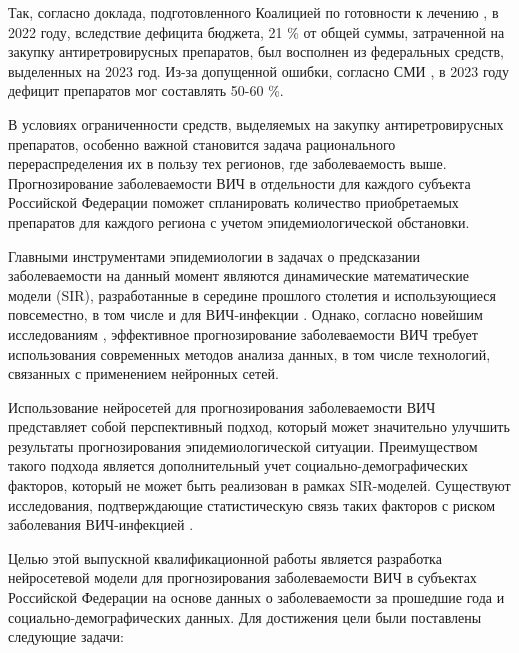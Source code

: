     Так, согласно доклада, подготовленного Коалицией по готовности к лечению \cite{Мониторинг_закупок_препаратов_ITPC}, в 2022 году, вследствие дефицита бюджета, 21 \% от общей суммы, затраченной на закупку антиретровирусных препаратов, был восполнен из федеральных средств, выделенных на 2023 год. Из-за допущенной ошибки, согласно СМИ \cite{ngs_ru_deficit_2023,fontanka_deficit}, в 2023 году дефицит препаратов мог составлять 50-60 \%.

    В условиях ограниченности средств, выделяемых на закупку антиретровирусных препаратов, особенно важной становится задача рационального перераспределения их в пользу тех регионов, где заболеваемость выше. Прогнозирование заболеваемости ВИЧ в отдельности для каждого субъекта Российской Федерации поможет спланировать количество приобретаемых препаратов для каждого региона с учетом эпидемиологической обстановки.
    
    Главными инструментами эпидемиологии в задачах о предсказании заболеваемости на данный момент являются динамические математические модели (SIR), разработанные в середине прошлого столетия и использующиеся повсеместно, в том числе и для ВИЧ-инфекции \cite{Лопатин_про_SIR,Sokolova_SIR_HIV,Brauer_про_SIR,Huppert_Katriel_SIR}. Однако, согласно новейшим исследованиям \cite{LSTM_for_HIV, NN_REVIEW_for_HIV, NN_FORECASTING_for_HIV}, эффективное прогнозирование заболеваемости ВИЧ требует использования современных методов анализа данных, в том числе технологий, связанных с применением нейронных сетей. 

    Использование нейросетей для прогнозирования заболеваемости ВИЧ представляет собой перспективный подход, который может значительно улучшить результаты прогнозирования эпидемиологической ситуации. Преимуществом такого подхода является дополнительный учет социально-демографических факторов, который не может быть реализован в рамках SIR-моделей. Существуют исследования, подтверждающие статистическую связь таких факторов с риском заболевания ВИЧ-инфекцией \cite{UrFu_socio_factors, Zanakis_Ortiz_socio_factors}. 
    
    Целью этой выпускной квалификационной работы является разработка нейросетевой модели для прогнозирования заболеваемости ВИЧ в субъектах Российской Федерации на основе данных о заболеваемости за прошедшие года и социально-демографических данных. Для достижения цели были поставлены следующие задачи:

